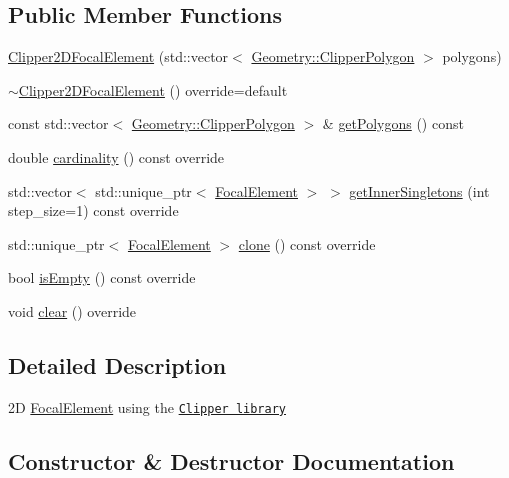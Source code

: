 \subsection*{Public Member Functions}
\begin{DoxyCompactItemize}
\item 
\hyperlink{classClipper2DFocalElement_ae8687e5aa208657a22429ac63182f183}{Clipper2\+D\+Focal\+Element} (std\+::vector$<$ \hyperlink{classGeometry_1_1ClipperPolygon}{Geometry\+::\+Clipper\+Polygon} $>$ polygons)
\item 
\hyperlink{classClipper2DFocalElement_a69afddff55e6195330e864f33e78559a}{$\sim$\+Clipper2\+D\+Focal\+Element} () override=default
\item 
const std\+::vector$<$ \hyperlink{classGeometry_1_1ClipperPolygon}{Geometry\+::\+Clipper\+Polygon} $>$ \& \hyperlink{classClipper2DFocalElement_a933998b031a0063252d7aa63cd0cd145}{get\+Polygons} () const 
\item 
double \hyperlink{classClipper2DFocalElement_a8eabcd9808b5b6bb7ec2f26eb89b5cd9}{cardinality} () const override
\item 
std\+::vector$<$ std\+::unique\+\_\+ptr$<$ \hyperlink{classFocalElement}{Focal\+Element} $>$ $>$ \hyperlink{classClipper2DFocalElement_a2455cb3cc5940ecee3e012bcdcc25f44}{get\+Inner\+Singletons} (int step\+\_\+size=1) const override
\item 
std\+::unique\+\_\+ptr$<$ \hyperlink{classFocalElement}{Focal\+Element} $>$ \hyperlink{classClipper2DFocalElement_a43aa82869ed3bf22682907ec9c475930}{clone} () const override
\item 
bool \hyperlink{classClipper2DFocalElement_ae79aa59bb6a1109d729a32240631d573}{is\+Empty} () const override
\item 
void \hyperlink{classClipper2DFocalElement_aa1110dabb3e01c681826374d1a485670}{clear} () override
\end{DoxyCompactItemize}


\subsection{Detailed Description}
2\+D \hyperlink{classFocalElement}{Focal\+Element} using the \href{http://www.angusj.com/delphi/clipper.php}{\tt Clipper library} 

\subsection{Constructor \& Destructor Documentation}
\hypertarget{classClipper2DFocalElement_ae8687e5aa208657a22429ac63182f183}{}
